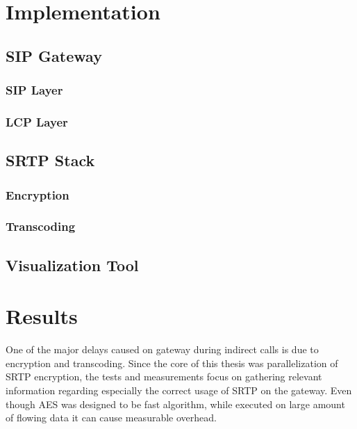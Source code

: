 \chapter{Implementation}\label{chapter:implementation}

\section{SIP Gateway}
\subsection{SIP Layer}
\subsection{LCP Layer}


\section{SRTP Stack}
\subsection{Encryption}
\subsection{Transcoding}

\section{Visualization Tool}






\chapter{Results}\label{chapter:results}
One of the major delays caused on gateway during indirect calls is due to
encryption and transcoding. Since the core of this thesis was parallelization
of SRTP encryption, the tests and measurements focus on gathering relevant
information regarding especially the correct usage of SRTP on the gateway. Even
though AES was designed to be fast algorithm, while executed on large amount of
flowing data it can cause measurable overhead.

